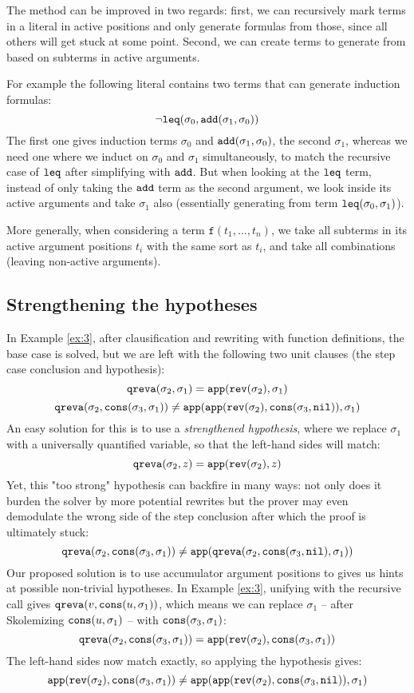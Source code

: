 The method can be improved in two regards: first, we can recursively mark terms in a literal in active positions and only generate formulas from those, since all others will get stuck at some point. Second, we can create terms to generate from based on subterms in active arguments.

For example the following literal contains two terms that can generate induction formulas:
$$\neg\mathtt{leq}(\sigma_0,\mathtt{add}(\sigma_1,\sigma_0))$$
The first one gives induction terms $\sigma_0$ and $\mathtt{add}(\sigma_1,\sigma_0)$, the second $\sigma_1$, whereas we need one where we induct on $\sigma_0$ and $\sigma_1$ simultaneously, to match the recursive case of $\mathtt{leq}$ after simplifying with $\mathtt{add}$. But when looking at the $\mathtt{leq}$ term, instead of only taking the $\mathtt{add}$ term as the second argument, we look inside its active arguments and take $\sigma_1$ also (essentially generating from term $\mathtt{leq}(\sigma_0, \sigma_1)$).

More generally, when considering a term $\mathtt{f}(t_1,...,t_n)$, we take all subterms in its active argument positions $t_i$ with the same sort as $t_i$, and take all combinations (leaving non-active arguments).
\subsection{Strengthening the hypotheses}
In Example \ref{ex:3}, after clausification and rewriting with function definitions, the base case is solved, but we are left with the following two unit clauses (the step case conclusion and hypothesis):
$$\mathtt{qreva}(\sigma_2,\sigma_1)=\mathtt{app}(\mathtt{rev}(\sigma_2),\sigma_1)$$
$$\mathtt{qreva}(\sigma_2,\mathtt{cons}(\sigma_3,\sigma_1))\neq\mathtt{app}(\mathtt{app}(\mathtt{rev}(\sigma_2),\mathtt{cons}(\sigma_3,\mathtt{nil})),\sigma_1)$$
An easy solution for this is to use a \textit{strengthened hypothesis}, where we replace $\sigma_1$ with a universally quantified variable, so that the left-hand sides will match:
$$\mathtt{qreva}(\sigma_2,z)=\mathtt{app}(\mathtt{rev}(\sigma_2),z)$$
Yet, this "too strong" hypothesis can backfire in many ways: not only does it burden the solver by more potential rewrites but the prover may even demodulate the wrong side of the step conclusion after which the proof is ultimately stuck:
$$\mathtt{qreva}(\sigma_2,\mathtt{cons}(\sigma_3,\sigma_1))\neq\mathtt{app}(\mathtt{qreva}(\sigma_2,\mathtt{cons}(\sigma_3,\mathtt{nil}),\sigma_1))$$
Our proposed solution is to use accumulator argument positions to gives us hints at possible non-trivial hypotheses. In Example \ref{ex:3}, unifying with the recursive call gives $\mathtt{qreva}(v, \mathtt{cons}(u,\sigma_1))$, which means we can replace $\sigma_1$ -- after Skolemizing $\mathtt{cons}(u,\sigma_1)$ -- with $\mathtt{cons}(\sigma_3,\sigma_1)$:
$$\mathtt{qreva}(\sigma_2,\mathtt{cons}(\sigma_3,\sigma_1))=\mathtt{app}(\mathtt{rev}(\sigma_2),\mathtt{cons}(\sigma_3,\sigma_1))$$
The left-hand sides now match exactly, so applying the hypothesis gives:
$$\mathtt{app}(\mathtt{rev}(\sigma_2),\mathtt{cons}(\sigma_3,\sigma_1))\neq\mathtt{app}(\mathtt{app}(\mathtt{rev}(\sigma_2),\mathtt{cons}(\sigma_3,\mathtt{nil})),\sigma_1)$$

